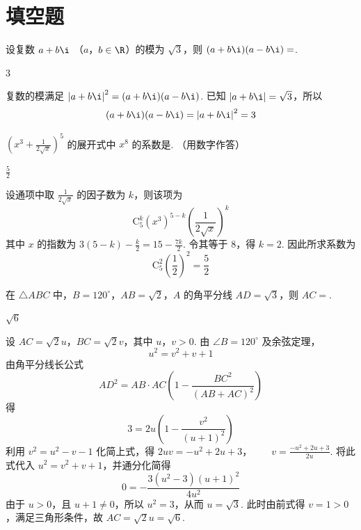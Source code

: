 \section{填空题}

\begin{problem}
设复数 \(a + b\i\) （\(a\)，\(b \in \R\)）的模为 \(\sqrt{3}\)，则 \((a + b\i)(a - b\i) = \)\fillinblank{}.

\begin{answer}
\(3\)
\end{answer}

\begin{solution}
复数的模满足 \(\left|a+b\i\right|^2=(a+b\i)(a-b\i)\). 已知 \(\left|a+b\i\right|=\sqrt3\)，所以
\[
(a+b\i)(a-b\i)=\left|a+b\i\right|^2=3
\]
\end{solution}
\end{problem}

\begin{problem}
\(\left(x^{3} + \frac{1}{2\sqrt{x}}\right)^{5}\) 的展开式中 \(x^{8}\) 的系数是\fillinblank{}. （用数字作答）

\begin{answer}
\(\frac{5}{2}\)
\end{answer}

\begin{solution}
设通项中取 \(\frac{1}{2\sqrt{x}}\) 的因子数为 \(k\)，则该项为
\[
\mathrm C_5^k\left(x^3\right)^{5-k}\left(\frac{1}{2\sqrt{x}}\right)^k
\]
其中 \(x\) 的指数为 \(3(5-k)-\frac{k}{2}=15-\frac{7k}{2}\). 令其等于 \(8\)，得 \(k=2\). 因此所求系数为
\[
\mathrm C_5^2\left(\frac12\right)^2=\frac{5}{2}
\]
\end{solution}
\end{problem}

\begin{problem}
在 \(\triangle ABC\) 中，\(B = 120^{\circ}\)，\(AB = \sqrt{2}\)，\(A\) 的角平分线 \(AD = \sqrt{3}\)，则 \(AC = \)\fillinblank{}.

\begin{answer}
\(\sqrt{6}\)
\end{answer}

\begin{solution}
设 \(AC=\sqrt2u\)，\(BC=\sqrt2v\)，其中 \(u\)，\(v>0\). 由 \(\angle B=120^\circ\) 及余弦定理，
\[
u^2=v^2+v+1
\]
由角平分线长公式
\[
AD^2=AB\cdot AC\left(1-\frac{BC^2}{(AB+AC)^2}\right)
\]
得
\[
3=2u\left(1-\frac{v^2}{(u+1)^2}\right)
\]
利用 \(v^2=u^2-v-1\) 化简上式，得
\(2uv=-u^2+2u+3\)，\(\qquad v=\frac{-u^2+2u+3}{2u}\).
将此式代入 \(u^2=v^2+v+1\)，并通分化简得
\[
0=-\frac{3(u^2-3)(u+1)^2}{4u^2}
\]
由于 \(u>0\)，且 \(u+1\ne0\)，所以 \(u^2=3\)，从而 \(u=\sqrt3\). 此时由前式得 \(v=1>0\)，满足三角形条件，故 \(AC=\sqrt2u=\sqrt6\).
\end{solution}
\end{problem}

